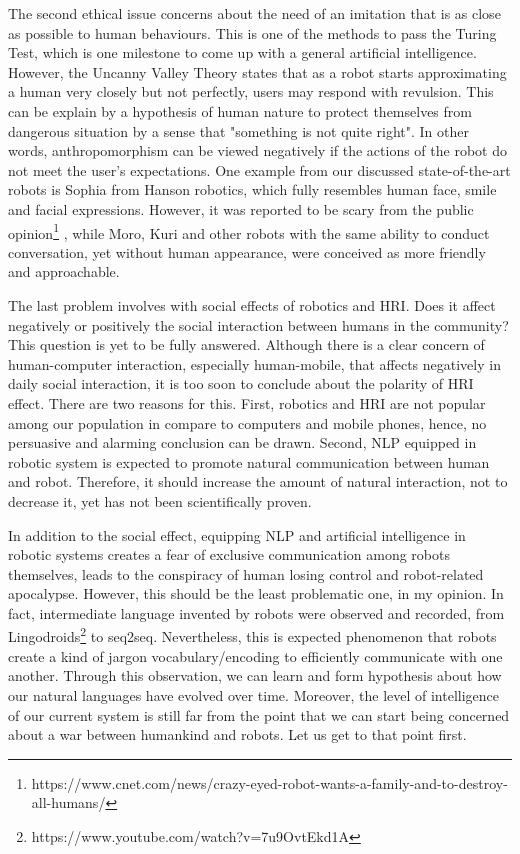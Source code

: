 \documentclass[10pt, a4paper]{article}
\begin{document}
The second ethical issue concerns about the need of an imitation that is as close as possible to human behaviours. This is one of the methods to pass the Turing Test, which is one milestone to come up with a general artificial intelligence. However, the Uncanny Valley Theory\cite{mori2012uncanny} states that as a robot starts approximating a human very closely but not perfectly, users may respond with revulsion. This can be explain by a hypothesis of human nature to protect themselves from dangerous situation by a sense that "something is not quite right". In other words, anthropomorphism can be viewed negatively if the actions of the robot do not meet the user's expectations. One example from our discussed state-of-the-art robots is Sophia from Hanson robotics, which fully resembles  human face, smile and facial expressions. However, it was reported to be scary from the public opinion\footnote{https://www.cnet.com/news/crazy-eyed-robot-wants-a-family-and-to-destroy-all-humans/} , while Moro, Kuri and other robots with the same ability to conduct conversation, yet without human appearance, were conceived as more friendly and approachable.

The last problem involves with social effects of robotics and HRI. Does it affect negatively or positively the social interaction between humans in the community? This question is yet to be fully answered. Although there is a clear concern of human-computer interaction, especially human-mobile, that affects negatively in daily social interaction, it is too soon to conclude about the polarity of HRI effect. There are two reasons for this. First, robotics and HRI are not popular among our population in compare to computers and mobile phones, hence, no persuasive and alarming conclusion can be drawn. Second, NLP equipped in robotic system is expected to promote natural communication between human and robot. Therefore, it should increase the amount of natural interaction, not to decrease it, yet has not been scientifically proven.

In addition to the social effect, equipping NLP and artificial intelligence in robotic systems creates a fear of exclusive communication among robots themselves, leads to the conspiracy of human losing control and robot-related apocalypse. However, this should be the least problematic one, in my opinion. In fact, intermediate language invented by robots were observed and recorded, from Lingodroids\cite{schulz2010robots}\footnote{https://www.youtube.com/watch?v=7u9OvtEkd1A} to seq2seq. Nevertheless, this is expected phenomenon that robots create a kind of jargon vocabulary/encoding to efficiently communicate with one another. Through this observation, we can learn and form hypothesis about how our natural languages have evolved over time. Moreover, the level of intelligence of our current system is still far from the point that we can start being concerned about a war between humankind and robots. Let us get to that point first.
\end{document}
